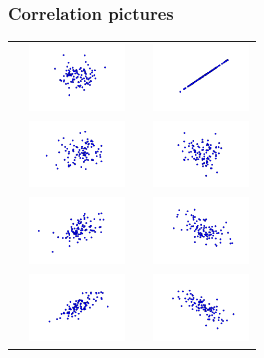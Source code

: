 \documentclass[smaller,handout]{beamer}
\begin{document}
\begin{frame}
\frametitle{Correlation pictures}

\begin{tabular}{cccc}
\raisebox{.3in}{$r = 0$} & \includegraphics[width=1in]{corr000.png}
&
\raisebox{.3in}{$r = 1$} & \includegraphics[width=1in]{corr100.png}
\\
\raisebox{.3in}{$r = 0.25$} & \includegraphics[width=1in]{corr025.png}
&
\raisebox{.3in}{$r = -0.25$} & \includegraphics[width=1in]{corr-025.png}
\\
\raisebox{.3in}{$r = 0.5$} & \includegraphics[width=1in]{corr050.png}
&
\raisebox{.3in}{$r = -0.5$} & \includegraphics[width=1in]{corr-050.png}
\\
\raisebox{.3in}{$r = 0.75$} & \includegraphics[width=1in]{corr075.png} 
&
\raisebox{.3in}{$r = -0.75$} & \includegraphics[width=1in]{corr-075.png}
\end{tabular}

\end{frame}
\end{document}
